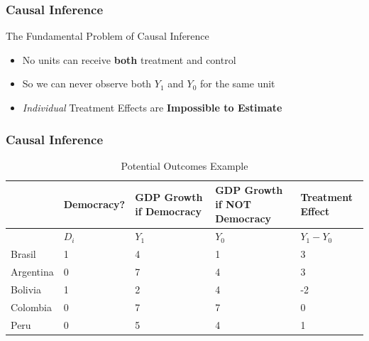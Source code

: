 \documentclass[xcolor=x11names,compress]{beamer}\usepackage[]{graphicx}\usepackage[]{color}
\renewcommand{\(}{\begin{columns}}
\renewcommand{\)}{\end{columns}}
\newcommand{\<}[1]{\begin{column}{#1}}
\renewcommand{\>}{\end{column}}
\begin{document}
\begin{frame}
\frametitle{Causal Inference}
\begin{block}{The Fundamental Problem of Causal Inference}
\begin{itemize}
\item No units can receive \textbf{both} treatment and control
\item So we can never observe both $Y_1$ and $Y_0$ for the same unit
\item \textit{Individual} Treatment Effects are \textbf{Impossible to Estimate}
\end{itemize}
\end{block}
\end{frame}

\begin{frame}
\frametitle{Causal Inference}
\footnotesize
\begin{table}[htbp]
  \centering
  \caption{Potential Outcomes Example}
    \begin{tabular}{|p{1.8cm}|p{1.8cm}|p{2cm}|p{2cm}|p{2cm}|}
    \hline
          & \multicolumn{1}{p{1.8cm}|}{Democracy?} & \multicolumn{1}{p{2cm}|}{GDP Growth if Democracy} & \multicolumn{1}{p{2.2cm}|}{GDP Growth if NOT Democracy} &  Treatment Effect \bigstrut\\
    \hline
          & \multicolumn{1}{p{1.8cm}|}{$D_i$} & \multicolumn{1}{p{2cm}|}{$Y_1$} & \multicolumn{1}{p{2.2cm}|}{$Y_0$} & \multicolumn{1}{p{1.8cm}|}{$Y_{1} - Y_{0}$} \bigstrut\\
    \hline
    Brasil & 1 & 4     & 1      & 3 \bigstrut\\
    \hline
    Argentina & 0 & 7    & 4      & 3 \bigstrut\\
    \hline
    Bolivia & 1 & 2     & 4     & -2 \bigstrut\\
    \hline
    Colombia & 0 &  7   & 7    & 0 \bigstrut\\
    \hline
    Peru & 0 & 5     & 4     & 1 \bigstrut\\
\hline
    \end{tabular}%
  \label{tab:addlabel}%
\end{table}%
\normalsize
\end{frame}
\end{document}
